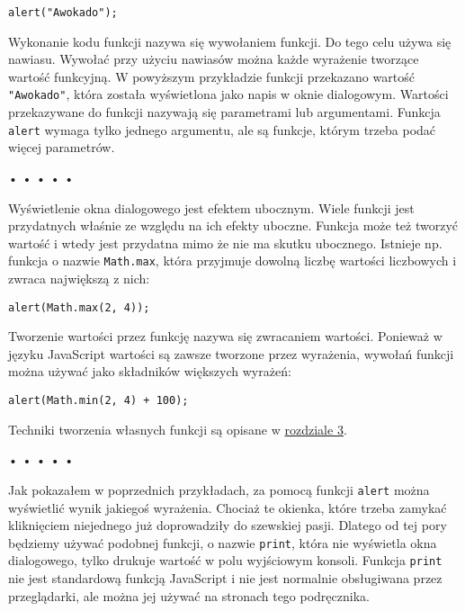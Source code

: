 \begin{verbatim} 
alert("Awokado");
\end{verbatim}
    
Wykonanie kodu funkcji nazywa się wywołaniem funkcji. Do tego celu używa się nawiasu. Wywołać przy użyciu nawiasów\index{()} można każde wyrażenie tworzące wartość funkcyjną. W powyższym przykładzie funkcji przekazano wartość \texttt{"Awokado"}, która została wyświetlona jako napis w oknie dialogowym. Wartości przekazywane do funkcji nazywają się parametrami lub argumentami. Funkcja \texttt{alert} wymaga tylko jednego argumentu, ale są funkcje, którym trzeba podać więcej parametrów.

  
\begin{center}
• • • • •
\end{center}
  
    
Wyświetlenie okna dialogowego jest efektem ubocznym. Wiele funkcji jest przydatnych właśnie ze względu na ich efekty uboczne. Funkcja może też tworzyć wartość i wtedy jest przydatna mimo że nie ma skutku ubocznego. Istnieje np. funkcja o nazwie \texttt{Math.max}, która przyjmuje dowolną liczbę wartości liczbowych i zwraca największą z nich:

\begin{verbatim} 
alert(Math.max(2, 4));
\end{verbatim}
    
Tworzenie wartości przez funkcję nazywa się zwracaniem wartości. Ponieważ w języku JavaScript wartości są zawsze tworzone przez wyrażenia, wywołań funkcji można używać jako składników większych wyrażeń:

\begin{verbatim} 
alert(Math.min(2, 4) + 100);
\end{verbatim}
    
Techniki tworzenia własnych funkcji są opisane w \hyperref[chap:3]{rozdziale 3}.

  
\begin{center}
• • • • •
\end{center}
  
    
Jak pokazałem w poprzednich przykładach, za pomocą funkcji \texttt{alert} można wyświetlić wynik jakiegoś wyrażenia. Chociaż te okienka, które trzeba zamykać kliknięciem niejednego już doprowadziły do szewskiej pasji. Dlatego od tej pory będziemy używać podobnej funkcji, o nazwie \texttt{print}, która nie wyświetla okna dialogowego, tylko drukuje wartość w polu wyjściowym konsoli. Funkcja \texttt{print} nie jest standardową funkcją JavaScript i nie jest normalnie obsługiwana przez przeglądarki, ale można jej używać na stronach tego podręcznika.

